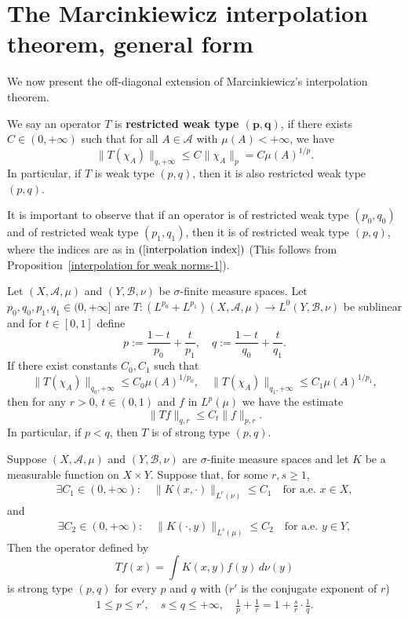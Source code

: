 \section{The Marcinkiewicz interpolation theorem, general form}
We now present the off-diagonal extension of Marcinkiewicz's interpolation theorem.
\begin{definition}
We say an operator $T$ is \textbf{restricted weak type $\bm{(p,q)}$}, if there exists $C\in(0,+\infty)$ such that for all $A\in\mathcal{A}$ with $\mu(A)<+\infty$, we have
\[\|T(\chi_A)\|_{q,+\infty}\leq C\|\chi_A\|_{p}=C\mu(A)^{1/p}.\]
In particular, if $T$ is weak type $(p,q)$, then it is also restricted weak type $(p,q)$.
\end{definition}
It is important to observe that if an operator is of restricted weak type $(p_0,q_0)$ and of restricted weak type $(p_1,q_1)$, then it is of restricted weak type $(p,q)$, where the indices are as in $(\ref{interpolation index})$ (This follows from Proposition~\ref{interpolation for weak norms-1}).
\begin{theorem}
Let $(X,\mathcal{A},\mu)$ and $(Y,\mathcal{B},\nu)$ be $\sigma$-finite measure spaces. Let $p_0,q_0,p_1,q_1\in(0,+\infty]$ are $T:(L^{p_0}+L^{p_1})(X,\mathcal{A},\mu)\to L^0(Y,\mathcal{B},\nu)$ be sublinear and for $t\in[0,1]$ define
\[p:=\frac{1-t}{p_0}+\frac{t}{p_1},\quad q:=\frac{1-t}{q_0}+\frac{t}{q_1}.\]
If there exist constants $C_0,C_1$ such that
\[\|T(\chi_A)\|_{q_0,+\infty}\leq C_0\mu(A)^{1/p_0},\quad \|T(\chi_A)\|_{q_1,+\infty}\leq C_1\mu(A)^{1/p_1},\]
then for any $r>0$, $t\in(0,1)$ and $f$ in $L^{p}(\mu)$ we have the estimate
\[\|Tf\|_{q,r}\leq C_t\|f\|_{p,r}.\]
In particular, if $p<q$, then $T$ is of strong type $(p,q)$. 
\end{theorem}
\begin{proposition}\label{Schur test extended}
Suppose $(X,\mathcal{A},\mu)$ and $(Y,\mathcal{B},\nu)$ are $\sigma$-finite measure spaces and let $K$ be a measurable function on $X\times Y$. Suppose that, for some $r,s\geq 1$,
\begin{align}\label{Schur test extended-1}
\exists C_1\in(0,+\infty):\quad \|K(x,\cdot)\|_{L^r(\nu)}\leq C_1\quad\text{for a.e. $x\in X$},
\end{align}
and
\begin{align}\label{Schur test extended-2}
\exists C_2\in(0,+\infty):\quad \|K(\cdot,y)\|_{L^s(\mu)}\leq C_2\quad\text{for a.e. $y\in Y$},
\end{align}
Then the operator defined by
\[Tf(x)=\int K(x,y)f(y)\,d\nu(y)\]
is strong type $(p,q)$ for every $p$ and $q$ with ($r'$ is the conjugate exponent of $r$)
\begin{align}\label{Schur test extended-3}
1\leq p\leq r',\quad s\leq q\leq+\infty,\quad \frac{1}{p}+\frac{1}{r}=1+\frac{s}{r}\cdot\frac{1}{q}.
\end{align}
\end{proposition}
